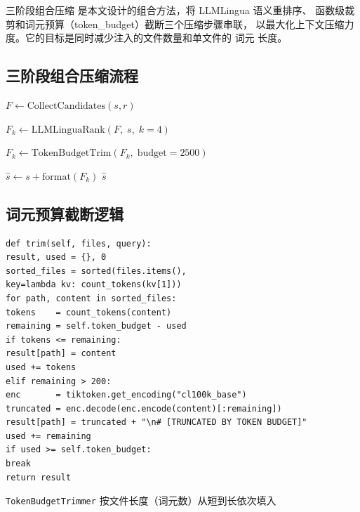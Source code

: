 三阶段组合压缩 是本文设计的组合方法，将 LLMLingua 语义重排序、
函数级裁剪和词元预算（token\_budget）截断三个压缩步骤串联，
以最大化上下文压缩力度。它的目标是同时减少注入的文件数量和单文件的 词元 长度。

\subsection{三阶段组合压缩流程}

\begin{algorithm}[H]
\caption{三阶段组合压缩（hybrid\_llmlingua）}
\label{alg:hybrid}

\BlankLine
{}
$F \leftarrow \text{CollectCandidates}(s, r)$ 

\BlankLine
{}
$F_k \leftarrow \text{LLMLinguaRank}(F,\; s,\; k=4)$\;

\BlankLine
{}

\BlankLine
{}
$F_k \leftarrow \text{TokenBudgetTrim}(F_k,\; \text{budget}=2500)$\;

\BlankLine
$\hat{s} \leftarrow s + \text{format}(F_k)$\;
\Return $\hat{s}$\;
\end{algorithm}

\subsection{词元预算截断逻辑}

\begin{lstlisting}[style=promptstyle, caption={TokenBudgetTrimmer 截断逻辑（节选自 src/compression/context\_compressor.py）}, label={lst:budget-trimmer}]
def trim(self, files, query):
result, used = {}, 0
sorted_files = sorted(files.items(),
key=lambda kv: count_tokens(kv[1]))
for path, content in sorted_files:
tokens    = count_tokens(content)
remaining = self.token_budget - used
if tokens <= remaining:
result[path] = content
used += tokens
elif remaining > 200:
enc       = tiktoken.get_encoding("cl100k_base")
truncated = enc.decode(enc.encode(content)[:remaining])
result[path] = truncated + "\n# [TRUNCATED BY TOKEN BUDGET]"
used += remaining
if used >= self.token_budget:
break
return result
\end{lstlisting}
\texttt{TokenBudgetTrimmer} 按文件长度（词元数）从短到长依次填入

